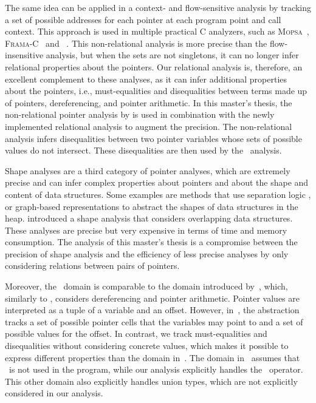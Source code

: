 The same idea can be applied in a context- and flow-sensitive analysis by tracking a set of possible addresses for each pointer at each program point and call context.
This approach is used in multiple practical C analyzers, such as \textsc{Mopsa}~\cite{mopsa}, \textsc{Frama-C}~\cite{framac,Bühler2024} and \goblint~\cite{goblint}.
This non-relational analysis is more precise than the flow-insensitive analysis, but when the sets are not singletons, it can no longer infer relational properties about the pointers.
Our relational analysis is, therefore, an excellent complement to these analyses, as it can infer additional properties about the pointers, i.e., must-equalities and disequalities between terms made up of pointers, dereferencing, and pointer arithmetic.
In this master's thesis, the non-relational pointer analysis by \textcite{goblint} is used in combination with the newly implemented relational analysis to augment the precision.
The non-relational analysis infers disequalities between two pointer variables whose sets of possible values do not intersect.
These disequalities are then used by the \cpo\ analysis.

Shape analyses are a third category of pointer analyses, which are extremely precise and can infer complex properties about pointers and about the shape and content of data structures.
Some examples are methods that use separation logic \cite{separationlogic,rivalpapers}, or graph-based representations \cite{predator} to abstract the shapes of data structures in the heap.
\textcite{kreiker} introduced a shape analysis that considers overlapping data structures.
These analyses are precise but very expensive in terms of time and memory consumption.
The analysis of this master's thesis is a compromise between the precision of shape analysis and the efficiency of less precise analyses by only considering relations between pairs of pointers.

Moreover, the \cpo\ domain is comparable to the domain introduced by~\textcite{Mine06}, which, similarly to \cpo, considers dereferencing and pointer arithmetic.
Pointer values are interpreted as a tuple of a variable and an offset.
However, in~\cite{Mine06}, the abstraction tracks a set of possible pointer cells that the variables may point to and a set of possible values for the offset.
In contrast, we track must-equalities and disequalities without considering concrete values, which makes it possible to express different properties than the domain in~\cite{Mine06}.
The domain in~\cite{Mine06} assumes that \malloc\ is not used in the program, while our analysis explicitly handles the \malloc\ operator.
This other domain also explicitly handles union types, which are not explicitly considered in our analysis.

